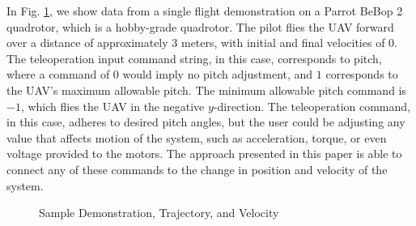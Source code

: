 \documentclass[letterpaper, 10 pt, conference]{ieeeconf}  %
\newcommand\NB[1]{$\spadesuit$\footnote{NB: #1}}
\begin{document}
In Fig. \ref{fig:samps}, we show data from a single flight demonstration on a Parrot BeBop 2 quadrotor, which is a hobby-grade quadrotor. The pilot flies the UAV forward over a distance of approximately $3$ meters, with initial and final velocities of $0$. The teleoperation input command string, in this case, corresponds to pitch, where a command of $0$ would imply no pitch adjustment, and $1$ corresponds to the UAV's maximum allowable pitch. The minimum allowable pitch command is $-1$, which flies the UAV in the negative $y$-direction. The teleoperation command, in this case, adheres to desired pitch angles, but the user could be adjusting any value that affects motion of the system, such as acceleration, torque, or even voltage provided to the motors. The approach presented in this paper is able to connect any of these commands to the change in position and velocity of the system. 
\begin{figure}[h]
	\centering
	\caption{Sample Demonstration, Trajectory, and Velocity}
	\label{fig:samps}
\end{figure}
\end{document}
